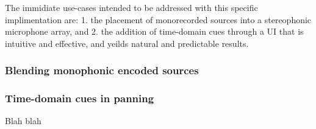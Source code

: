 The immidiate use-cases intended to be addressed with this specific implimentation are: 1. the placement of monorecorded sources into a stereophonic microphone array, and 2. the addition of time-domain cues through a UI that is intuitive and effective, and yeilds natural and predictable results.

\subsubsection{Blending monophonic encoded sources}



\subsubsection{Time-domain cues in panning}

Blah blah
